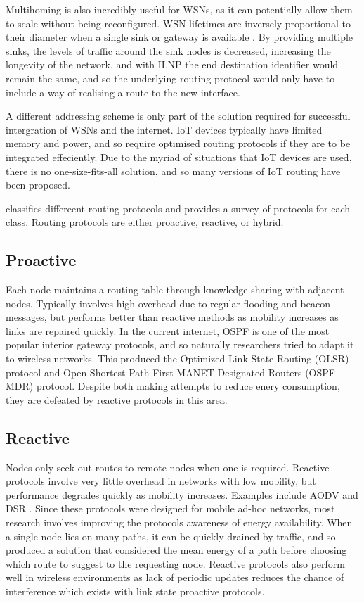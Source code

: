 \documentclass[12pt]{article}
\begin{document}
Multihoming is also incredibly useful for WSNs, as it can potentially allow them to scale without being reconfigured. WSN lifetimes are inversely proportional to their diameter when a single sink or gateway is available \cite{multisink}. By providing multiple sinks, the levels of traffic around the sink nodes is decreased, increasing the longevity of the network, and with ILNP the end destination identifier would remain the same, and so the underlying routing protocol would only have to include a way of realising a route to the new interface.

A different addressing scheme is only part of the solution required for successful intergration of WSNs and the internet. IoT devices typically have limited memory and power, and so require optimised routing protocols if they are to be integrated effeciently. Due to the myriad of situations that IoT devices are used, there is no one-size-fits-all solution, and so many versions of IoT routing have been proposed.

\cite{hassan} classifies differeent routing protocols and provides a survey of protocols for each class. Routing protocols are either proactive, reactive, or hybrid. 

\subsection{Proactive} 
Each node maintains a routing table through knowledge sharing with adjacent nodes. Typically involves high overhead due to regular flooding and beacon messages, but performs better than reactive methods as mobility increases as links are repaired quickly. In the current internet, OSPF is one of the most popular interior gateway protocols, and so naturally researchers tried to adapt it to wireless networks. This produced the Optimized Link State Routing (OLSR) protocol \cite{olsr} and Open Shortest Path First MANET Designated Routers (OSPF-MDR) protocol. Despite both making attempts to reduce enery consumption, they are defeated by reactive protocols in this area. 

\subsection{Reactive} 
Nodes only seek out routes to remote nodes when one is required. Reactive protocols involve very little overhead in networks with low mobility, but performance degrades quickly as mobility increases. Examples include AODV \cite{aodv} and DSR \cite{dsr}. Since these protocols were designed for mobile ad-hoc networks, most research involves improving the protocols awareness of energy availability. When a single node lies on many paths, it can be quickly drained by traffic, and so \cite{eaodv} produced a solution that considered the mean energy of a path before choosing which route to suggest to the requesting node. 
Reactive protocols also perform well in wireless environments as lack of periodic updates reduces the chance of interference which exists with link state proactive protocols.
\end{document}
